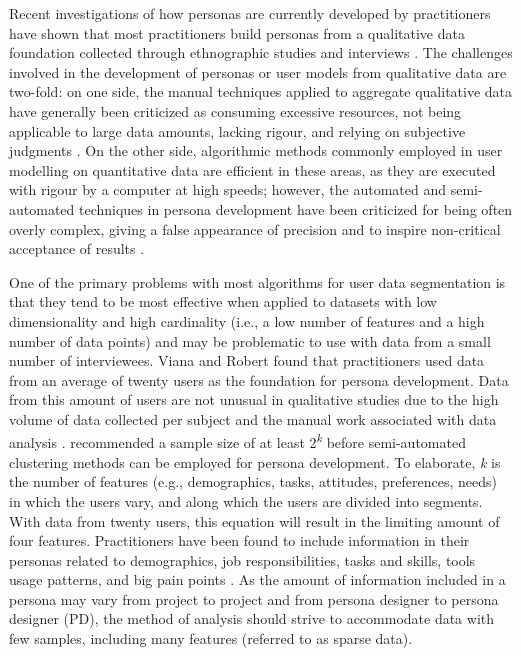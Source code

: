
Recent investigations of how personas are currently developed by practitioners have shown that most practitioners build personas from a qualitative data foundation collected through ethnographic studies and interviews \citep{Viana2016, Nielsen2014, Brickey2012}. The challenges involved in the development of personas or user models from qualitative data are two-fold: on one side, the manual techniques applied to aggregate qualitative data have generally been criticized as consuming excessive resources, not being applicable to large data amounts, lacking rigour, and relying on subjective judgments \citep{Brickey2012, Macia2015, Guest2003}.
On the other side, algorithmic methods commonly employed in user modelling on quantitative data are efficient in these areas, as they are executed with rigour by a computer at high speeds; however, the automated and semi-automated techniques in persona development have been criticized for being often overly complex, giving a false appearance of precision and to inspire non-critical acceptance of results \citep{Siegel2010}.


One of the primary problems with most algorithms for user data segmentation is that they tend to be most effective when applied to datasets with low dimensionality and high cardinality (i.e., a low number of features and a high number of data points) and may be problematic to use with data from a small number of interviewees. Viana and Robert \citep{Viana2016} found that practitioners used data from an average of twenty users as the foundation for persona development. Data from this amount of users are not unusual in qualitative studies due to the high volume of data collected per subject and the manual work associated with data analysis \citep{Bjrner2015}. \cite{Moser2012} recommended a sample size of at least 2\textsuperscript{\textit{k}} before semi-automated clustering methods can be employed for persona development.
To elaborate, \textit{k} is the number of features (e.g., demographics, tasks, attitudes, preferences, needs) in which the users vary, and along which the users are divided into segments. With data from twenty users, this equation will result in the limiting amount of four features. Practitioners have been found to include information in their personas related to demographics, job responsibilities, tasks and skills, tools usage patterns, and big pain points \citep{TaraMatthewsTejinderJudge2012, Viana2016}. As the amount of information included in a persona may vary from project to project and from persona designer to persona designer (PD), the method of analysis should strive to accommodate data with few samples, including many features (referred to as sparse data).


